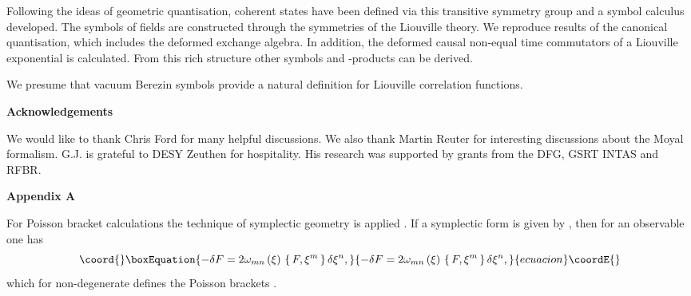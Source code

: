 \documentclass[a4paper,12pt]{article}
\def\theequation{\arabic{section}.\arabic{equation}}
\begin{document}
\noindent
Following the ideas of geometric quantisation, coherent states have
been defined via this transitive symmetry group and a symbol calculus
developed. The symbols of fields are constructed through the
symmetries of the Liouville theory.
We reproduce results of
the canonical quantisation, which includes the deformed exchange
algebra. In addition, the deformed causal non-equal time commutators
of a Liouville exponential is calculated.
From this rich structure other symbols and \myHighlight{$*$}\coordHE{}-products can be derived.

\noindent
We presume that vacuum Berezin symbols provide a natural
definition for Liouville correlation functions.

\vspace{0.8 cm}
\noindent
{\bf {\Large Acknowledgements}}

\vspace{0.3cm}

\noindent
We would like to thank Chris Ford for many helpful discussions.
We also thank Martin Reuter for interesting discussions about
the Moyal formalism.
G.J. is grateful to DESY Zeuthen for hospitality.  His
research was supported by grants from the DFG, GSRT INTAS and RFBR.


\vspace{0.5cm}
\vspace{0.5cm}

\setcounter{equation}{0}
\def\theequation{A.\arabic{equation}}

{\bf {\Large Appendix A}}

\vspace{0.5cm}

\noindent
For Poisson bracket calculations the technique of symplectic geometry
is applied \cite{Woodhouse}.  If a symplectic form is given by
\coordHE{}, then for
an observable \coordHE{} one has
\begin{equation}\coord{}\boxEquation{\label{PB-A}
-\delta F =2\omega_{mn}\,(\xi)\,\,\{\,F,\xi^m\,\}\,\delta\xi^n ,
}{-\delta F =2\omega_{mn}\,(\xi)\,\,\{\,F,\xi^m\,\}\,\delta\xi^n ,
}{ecuacion}\coordE{}\end{equation}
which for non-degenerate \coordHE{} defines the Poisson brackets
\coordHE{}.
\end{document}
